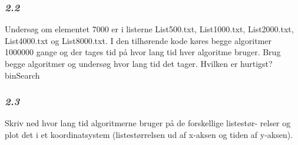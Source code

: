 \documentclass{article}
\begin{document}
\subsubsection{\textbf{\textit{2.2}}}
\begin{Maple Normal}{
Undersøg om elementet 7000 er i listerne List500.txt, List1000.txt,\linebreak
List2000.txt, List4000.txt og List8000.txt. I den tilhørende kode køres\linebreak
begge algoritmer 1000000 gange og der tages tid på hvor lang tid hver\linebreak
algoritme bruger. Brug begge algoritmer og undersøg hvor lang tid det\linebreak
tager. Hvilken er hurtigst?\linebreak
binSearch}\end{Maple Normal}

\begin{Maple Normal}{
}\end{Maple Normal}
\subsubsection{\textbf{\textit{2.3}}}
\begin{Maple Normal}{
Skriv ned hvor lang tid algoritmerne bruger på de forskellige listestør-\linebreak
relser og plot det i et koordinatsystem (listestørrelsen ud af x-aksen og\linebreak
tiden af y-aksen).\linebreak
}\end{Maple Normal}
\end{document}
